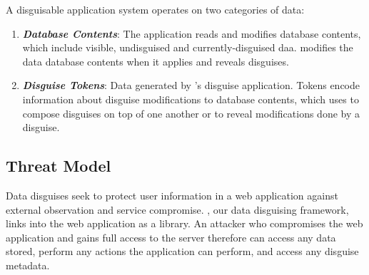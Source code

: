 \noindent
A disguisable application system operates on two categories of data:
\begin{enumerate}
    \item \emph{\textbf{Database Contents}}: The application reads and modifies database
        contents, which include visible, undisguised and currently-disguised daa.
        \sys modifies the data database contents when it applies and reveals disguises.
    \item \emph{\textbf{Disguise Tokens}}: Data generated by \sys's
        disguise application. Tokens encode information about disguise modifications to database
        contents, which \sys uses to compose disguises on top of one another or to reveal
        modifications done by a disguise. 
\end{enumerate}

\subsection{Threat Model}


%
Data disguises seek to protect user information in a web application against external observation
and service compromise.
%
\sys, our data disguising framework, links into the web application as a library.
%
An attacker who compromises the web application and gains full access to the server therefore
can access any data stored, perform any actions the application can perform, and access any
disguise metadata.
%

